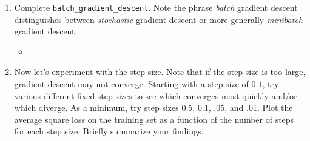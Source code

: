 \documentclass{article}
\begin{document}
\begin{enumerate}
\setcounter{enumi}{\value{saveenum}}
\item Complete \texttt{batch\_gradient\_descent}. Note the phrase \emph{batch} gradient descent distinguishes between \emph{stochastic} gradient
descent or more generally \emph{minibatch} gradient descent. 
\begin{itemize}
    \item \inputminted[firstline=147, lastline=175, breaklines=True]{python}{HW_2.PY.py}
\end{itemize}

\item Now let's experiment with the step size. Note that if the step size
is too large, gradient descent may not converge. Starting with a step-size of $0.1$, try various different fixed
step sizes to see which converges most quickly and/or which diverge.
As a minimum, try step sizes 0.5, 0.1, .05, and .01. Plot the average square loss on the training set as a function of the number of steps for
each step size. Briefly summarize your findings.




\end{enumerate}
\end{document}
